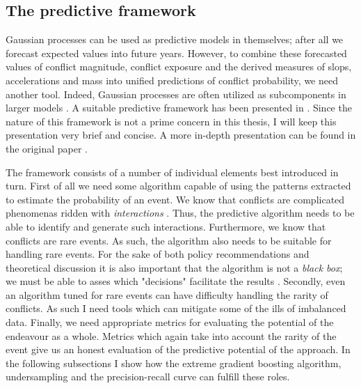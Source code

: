 \documentclass[a4paper]{article}
\begin{document}
\subsection{The predictive framework}


Gaussian processes can be used as predictive models in themselves; after all we forecast expected values into future years. However, to combine these forecasted values of conflict magnitude, conflict exposure and the derived measures of slops, accelerations and mass into unified predictions of conflict probability, we need another tool. Indeed, Gaussian processes are often utilized as subcomponents in larger models \citep[505]{Gelman_2013}. A suitable predictive framework has been presented in \cite{Maase}. Since the nature of this framework is not a prime concern in this thesis, I will keep this presentation very brief and concise. A more in-depth presentation can be found in the original paper \citep[9-12]{Maase}.\par %

The framework consists of a number of individual elements best introduced in turn. First of all we need some algorithm capable of using the patterns extracted to estimate the probability of an event. We know that conflicts are complicated phenomenas ridden with \emph{interactions} \citep[474]{cederman2017predicting}. Thus, the predictive algorithm needs to be able to identify and generate such interactions. Furthermore, we know that conflicts are rare events. As such, the algorithm also needs to be suitable for handling rare events. For the sake of both policy recommendations and theoretical discussion it is also important that the algorithm is not a \emph{black box}; we must be able to asses which "decisions" facilitate the results \cite[476]{cederman2017predicting}. Secondly, even an algorithm tuned for rare events can have difficulty handling the rarity of conflicts. As such I need tools which can mitigate some of the ills of imbalanced data. Finally, we need appropriate metrics for evaluating the potential of the endeavour as a whole. Metrics which again take into account the rarity of the event give us an honest evaluation of the predictive potential of the approach. In the following subsections I show how the extreme gradient boosting algorithm, undersampling and the precision-recall curve can fulfill these roles.\par
\end{document}
